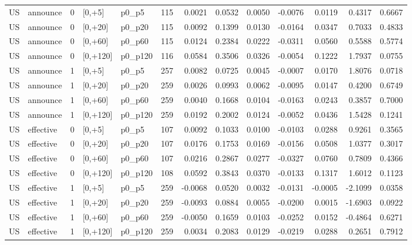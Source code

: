 \begin{tabular}{llrllrrrrrrrr}
US & announce & 0 & [0,+5] & p0_p5 & 115 & 0.0021 & 0.0532 & 0.0050 & -0.0076 & 0.0119 & 0.4317 & 0.6667 \\
US & announce & 0 & [0,+20] & p0_p20 & 115 & 0.0092 & 0.1399 & 0.0130 & -0.0164 & 0.0347 & 0.7033 & 0.4833 \\
US & announce & 0 & [0,+60] & p0_p60 & 115 & 0.0124 & 0.2384 & 0.0222 & -0.0311 & 0.0560 & 0.5588 & 0.5774 \\
US & announce & 0 & [0,+120] & p0_p120 & 116 & 0.0584 & 0.3506 & 0.0326 & -0.0054 & 0.1222 & 1.7937 & 0.0755 \\
US & announce & 1 & [0,+5] & p0_p5 & 257 & 0.0082 & 0.0725 & 0.0045 & -0.0007 & 0.0170 & 1.8076 & 0.0718 \\
US & announce & 1 & [0,+20] & p0_p20 & 259 & 0.0026 & 0.0993 & 0.0062 & -0.0095 & 0.0147 & 0.4200 & 0.6749 \\
US & announce & 1 & [0,+60] & p0_p60 & 259 & 0.0040 & 0.1668 & 0.0104 & -0.0163 & 0.0243 & 0.3857 & 0.7000 \\
US & announce & 1 & [0,+120] & p0_p120 & 259 & 0.0192 & 0.2002 & 0.0124 & -0.0052 & 0.0436 & 1.5428 & 0.1241 \\
US & effective & 0 & [0,+5] & p0_p5 & 107 & 0.0092 & 0.1033 & 0.0100 & -0.0103 & 0.0288 & 0.9261 & 0.3565 \\
US & effective & 0 & [0,+20] & p0_p20 & 107 & 0.0176 & 0.1753 & 0.0169 & -0.0156 & 0.0508 & 1.0377 & 0.3017 \\
US & effective & 0 & [0,+60] & p0_p60 & 107 & 0.0216 & 0.2867 & 0.0277 & -0.0327 & 0.0760 & 0.7809 & 0.4366 \\
US & effective & 0 & [0,+120] & p0_p120 & 108 & 0.0592 & 0.3843 & 0.0370 & -0.0133 & 0.1317 & 1.6012 & 0.1123 \\
US & effective & 1 & [0,+5] & p0_p5 & 259 & -0.0068 & 0.0520 & 0.0032 & -0.0131 & -0.0005 & -2.1099 & 0.0358 \\
US & effective & 1 & [0,+20] & p0_p20 & 259 & -0.0093 & 0.0884 & 0.0055 & -0.0200 & 0.0015 & -1.6903 & 0.0922 \\
US & effective & 1 & [0,+60] & p0_p60 & 259 & -0.0050 & 0.1659 & 0.0103 & -0.0252 & 0.0152 & -0.4864 & 0.6271 \\
US & effective & 1 & [0,+120] & p0_p120 & 259 & 0.0034 & 0.2083 & 0.0129 & -0.0219 & 0.0288 & 0.2651 & 0.7912 \\
\bottomrule
\end{tabular}
